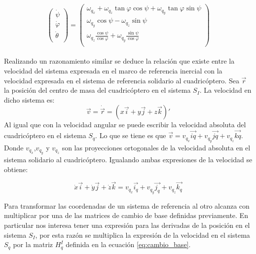 \documentclass[main]{subfiles}
\begin{document}
\begin{equation}
\left(\begin{array}{c}
\dot{\psi}\\
\dot{\varphi}\\
\dot{\theta}\\
\end{array}\right)=\left(\begin{array}{c}
\omega_{q_x} + \omega_{q_z}\tan\varphi \cos\psi + \omega_{q_y}\tan\varphi \sin\psi\\
\omega_{q_y}\cos \psi - \omega_{q_z}\sin\psi\\
\omega_{q_z} \frac{\cos\psi}{\cos\varphi}  + \omega_{q_y}\frac{\sin\psi}{\cos\varphi} \\
\end{array}\right)
\label{eq:euler}
\end{equation}\\

Realizando un razonamiento similar se deduce la relaci\'on que existe entre la velocidad del sistema expresada en el marco de referencia inercial con la velocidad expresada en el sistema de referencia solidario al cuadric\'optero. Sea $\vec{r}$ la posici\'on del centro de masa del cuadric\'optero en el sistema $S_I$. La velocidad en dicho sistema es:
\begin{equation}
\vec{v}=\dot{\vec{r}}=(x\vec{i}+y\vec{j}+z\vec{k})\prime
\end{equation}
Al igual que con la velocidad angular se puede escribir la velocidad absoluta del cuadric\'optero en el sistema $S_q$. Lo que se tiene es que $\vec{v} =v_{q_x}\vec{iq}+v_{q_y}\vec{jq}+v_{q_z}\vec{kq}$. Donde $v_{q_x}$,$v_{q_y}$ y $v_{q_z}$ son las proyecciones ortogonales de la velocidad absoluta en el sistema solidario al cuadric\'optero. Igualando ambas expresiones de la velocidad se obtiene: 

\begin{equation}
\dot{x}\vec{i}+\dot{y}\vec{j}+\dot{z}\vec{k} = v_{q_x} \vec{i_q}+v_{q_y} \vec{j_q}+v_{q_z} \vec{k_q}
\end{equation}

Para transformar las coordenadas de un sistema de referencia al otro alcanza con multiplicar por una de las matrices de cambio de base definidas previamente. En particular nos interesa tener una expresi\'on para las derivadas de la posici\'on en el sistema $S_I$, por esta raz\'on se multiplica la expresi\'on de la velocidad en el sistema $S_q$ por la matriz $H_q^I$ definida en la ecuaci\'on \ref{eq:cambio_base}. 
\end{document}
